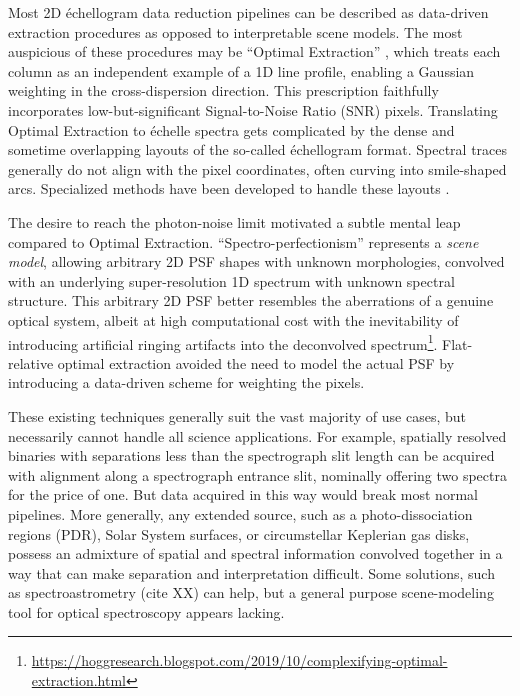 \documentclass[twocolumn]{aastex63}
\begin{document}
Most 2D \'echellogram data reduction pipelines can be described as data-driven extraction procedures as opposed to interpretable scene models. The most auspicious of these procedures may be ``Optimal Extraction'' \citep{1986PASP...98..609H}, which treats each column as an independent example of a 1D line profile, enabling a Gaussian weighting in the cross-dispersion direction.  This prescription faithfully incorporates low-but-significant Signal-to-Noise Ratio (SNR) pixels.  Translating Optimal Extraction to \'echelle spectra gets complicated by the dense and sometime overlapping layouts of the so-called \'echellogram format.  Spectral traces generally do not align with the pixel coordinates, often curving into smile-shaped arcs.  Specialized methods have been developed to handle these layouts \citep{2002A&A...385.1095P,2020arXiv200805827P}.

The desire to reach the photon-noise limit motivated a subtle mental leap compared to Optimal Extraction.  ``Spectro-perfectionism'' \citep{2010PASP..122..248B} represents a \emph{scene model}, allowing arbitrary 2D PSF shapes with unknown morphologies, convolved with an underlying super-resolution 1D spectrum with unknown spectral structure.  This arbitrary 2D PSF better resembles the aberrations of a genuine optical system, albeit at high computational cost with the inevitability of introducing artificial ringing artifacts into the deconvolved spectrum\footnote{\url{https://hoggresearch.blogspot.com/2019/10/complexifying-optimal-extraction.html}}.  Flat-relative optimal extraction \citep{2014A&A...561A..59Z} avoided the need to model the actual PSF by introducing a data-driven scheme for weighting the pixels.

These existing techniques generally suit the vast majority of use cases, but necessarily cannot handle all science applications.  For example, spatially resolved binaries with separations less than the spectrograph slit length can be acquired with alignment along a spectrograph entrance slit, nominally offering two spectra for the price of one.  But data acquired in this way would break most normal pipelines.  More generally, any extended source, such as a photo-dissociation regions (PDR), Solar System surfaces, or circumstellar Keplerian gas disks, possess an admixture of spatial and spectral information convolved together in a way that can make separation and interpretation difficult.  Some solutions, such as spectroastrometry (cite XX) can help, but a general purpose scene-modeling tool for optical spectroscopy appears lacking.
\end{document}
